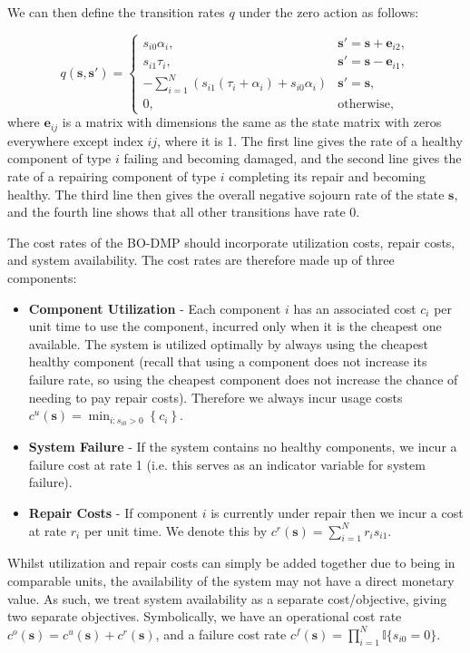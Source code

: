 \documentclass[11pt,authoryear,a4paper]{article}
\newcommand{\II}{\mathbb{I}}
\theoremstyle{definition}
\begin{document}
We can then define the transition rates $q$ under the zero action as follows:

$$q(\bm{s}, \bm{s'}) = \left\{
\begin{array}{cc}
     s_{i0}\alpha_i, &\bm{s'} = \bm{s} + \bm{e}_{i2},\\
     s_{i1}\tau_i , &\bm{s'} = \bm{s} - \bm{e}_{i1},\\
     -\sum_{i=1}^N\left(s_{i1}(\tau_i + \alpha_i) + s_{i0}\alpha_i\right) & \bm{s'} = \bm{s},\\
     0, & \text{otherwise,}
\end{array}\right.$$
where $\bm{e}_{ij}$ is a matrix with dimensions the same as the state matrix with zeros everywhere except index $ij$, where it is 1. The first line gives the rate of a healthy component of type $i$ failing and becoming damaged, and the second line gives the rate of a repairing component of type $i$ completing its repair and becoming healthy. The third line then gives the overall negative sojourn rate of the state $\bm{s}$, and the fourth line shows that all other transitions have rate 0.

The cost rates of the BO-DMP should incorporate utilization costs, repair costs, and system availability.  The cost rates are therefore made up of three components:
\begin{itemize}
    \item \textbf{Component Utilization} - Each component $i$ has an associated cost $c_i$ per unit time to use the component, incurred only when it is the cheapest one available. The system is utilized optimally by always using the cheapest healthy component {(recall that using a component does not increase its failure rate, so using the cheapest component does not increase the chance of needing to pay repair costs). Therefore we always incur usage costs $c^u(\bm{s})=\min_{i:s_{i0}>0}\left\{c_i\right\}$.}
    
    \item \textbf{System Failure} - If the system contains no healthy components, we incur a failure cost at rate 1 (i.e. this serves as an indicator variable for system failure).
    
    \item \textbf{Repair Costs} - If component $i$ is currently under repair then we incur a cost at rate $r_i$ per unit time. We denote this by $c^r(\bm{s})=\sum_{i=1}^Nr_is_{i1}$.
\end{itemize}

Whilst utilization and repair costs can simply be added together due to being in comparable units, the availability of the system may not have a direct monetary value. As such, we treat system availability as a separate cost/objective, giving two separate objectives. Symbolically, we have an operational cost rate
$c^o(\mathbf{s}) = c^u(\bm{s}) + c^r(\bm{s})$, and a failure cost rate
$c^f(\bm{s}) = \prod_{i=1}^N \II\{s_{i0} = 0\}$.
\end{document}
